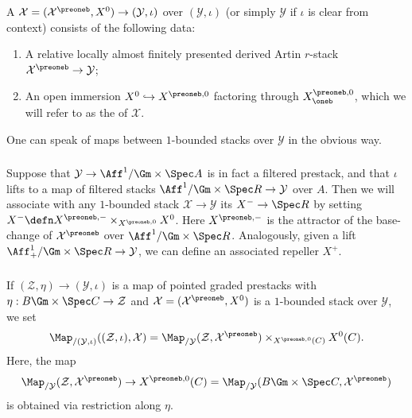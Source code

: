 \documentclass[10pt]{amsart}
\begin{document}
\begin{definition}
A  $\mathcal{X} = (\mathcal{X}^\preoneb,X^0)\to (\mathcal{Y},\iota)$ over $(\mathcal{Y},\iota)$ (or simply $\mathcal{Y}$ if $\iota$ is clear from context) consists of the following data: 
\begin{enumerate}
   \item A relative locally almost finitely presented derived Artin $r$-stack $\mathcal{X}^\preoneb\to \mathcal{Y}$;
   \item An open immersion $X^0\hookrightarrow X^{\preoneb,0}$ factoring through $X^{\preoneb,0}_{\oneb}$, which we will refer to as the  of $\mathcal{X}$.
\end{enumerate}

One can speak of maps between $1$-bounded stacks over $\mathcal{Y}$ in the obvious way. 
\end{definition}


\subsubsection{}
Suppose that $\mathcal{Y}\to \Aff^1/\Gm\times\Spec A$ is in fact a filtered prestack, and that $\iota$ lifts to a map of filtered stacks $\Aff^1/\Gm\times\Spec R\to \mathcal{Y}$ over $A$. Then we will associate with any $1$-bounded stack $\mathcal{X}\to \mathcal{Y}$ its  $X^-\to \Spec R$ by setting $X^- \defn X^{\preoneb,-}\times_{X^{\preoneb,0}}X^0$. Here $X^{\preoneb,-}$ is the attractor of the base-change of $\mathcal{X}^\preoneb$ over $\Aff^1/\Gm\times \Spec R$. Analogously, given a lift $\Aff^1_+/\Gm\times \Spec R\to \mathcal{Y}$, we can define an associated repeller $X^+$.

\subsubsection{}
If $(\mathcal{Z},\eta)\to (\mathcal{Y},\iota)$ is a map of pointed graded prestacks with $\eta:B\Gm\times \Spec C\to \mathcal{Z}$ and $\mathcal{X} = (\mathcal{X}^\preoneb,X^0)$ is a $1$-bounded stack over $\mathcal{Y}$, we set
\[
\Map_{/(\mathcal{Y},\iota)}((\mathcal{Z},\iota),\mathcal{X}) = \Map_{/\mathcal{Y}}(\mathcal{Z},\mathcal{X}^\preoneb)\times_{X^{\preoneb,0}(C)}X^0(C).
\]
Here, the map 
\[
\Map_{/\mathcal{Y}}(\mathcal{Z},\mathcal{X}^\preoneb)\to X^{\preoneb,0}(C) =\Map_{/\mathcal{Y}}(B\Gm\times\Spec C,\mathcal{X}^{\preoneb})
\]
is obtained via restriction along $\eta$.
\end{document}
